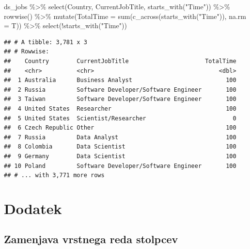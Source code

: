 \documentclass[
]{book}
\newenvironment{Shaded}{\begin{snugshade}}{\end{snugshade}}
\newcommand{\AttributeTok}[1]{\textcolor[rgb]{0.77,0.63,0.00}{#1}}
\newcommand{\FunctionTok}[1]{\textcolor[rgb]{0.00,0.00,0.00}{#1}}
\newcommand{\NormalTok}[1]{#1}
\newcommand{\SpecialCharTok}[1]{\textcolor[rgb]{0.00,0.00,0.00}{#1}}
\newcommand{\StringTok}[1]{\textcolor[rgb]{0.31,0.60,0.02}{#1}}
\begin{document}
\begin{Shaded}
\begin{Highlighting}[]
\NormalTok{ds\_jobs }\SpecialCharTok{\%\textgreater{}\%}
  \FunctionTok{select}\NormalTok{(Country, CurrentJobTitle, }\FunctionTok{starts\_with}\NormalTok{(}\StringTok{"Time"}\NormalTok{)) }\SpecialCharTok{\%\textgreater{}\%}
  \FunctionTok{rowwise}\NormalTok{() }\SpecialCharTok{\%\textgreater{}\%}
  \FunctionTok{mutate}\NormalTok{(}\AttributeTok{TotalTime =} \FunctionTok{sum}\NormalTok{(}\FunctionTok{c\_across}\NormalTok{(}\FunctionTok{starts\_with}\NormalTok{(}\StringTok{"Time"}\NormalTok{)), }\AttributeTok{na.rm =}\NormalTok{ T)) }\SpecialCharTok{\%\textgreater{}\%}
  \FunctionTok{select}\NormalTok{(}\SpecialCharTok{!}\FunctionTok{starts\_with}\NormalTok{(}\StringTok{"Time"}\NormalTok{))}
\end{Highlighting}
\end{Shaded}

\begin{verbatim}
## # A tibble: 3,781 x 3
## # Rowwise: 
##    Country        CurrentJobTitle                      TotalTime
##    <chr>          <chr>                                    <dbl>
##  1 Australia      Business Analyst                           100
##  2 Russia         Software Developer/Software Engineer       100
##  3 Taiwan         Software Developer/Software Engineer       100
##  4 United States  Researcher                                 100
##  5 United States  Scientist/Researcher                         0
##  6 Czech Republic Other                                      100
##  7 Russia         Data Analyst                               100
##  8 Colombia       Data Scientist                             100
##  9 Germany        Data Scientist                             100
## 10 Poland         Software Developer/Software Engineer       100
## # ... with 3,771 more rows
\end{verbatim}

\hypertarget{dodatek}{%
\section{Dodatek}\label{dodatek}}

\hypertarget{zamenjava-vrstnega-reda-stolpcev}{%
\subsection{Zamenjava vrstnega reda stolpcev}\label{zamenjava-vrstnega-reda-stolpcev}}
\end{document}

